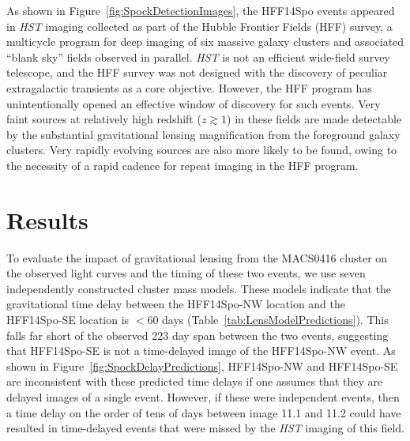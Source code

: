 \documentclass{article}
\def\HST{{\it HST}\xspace}
\def\spock{HFF14Spo\xspace}
\def\spockone{HFF14Spo-NW\xspace}
\def\spocktwo{HFF14Spo-SE\xspace}
\def\MACS0416{MACS0416\xspace}
\begin{document}
As shown in Figure~\ref{fig:SpockDetectionImages}, the \spock events
appeared in \HST imaging collected as part of
the Hubble Frontier Fields (HFF) survey\cite{Lotz:2017}, a multicycle
program for deep imaging of six massive galaxy clusters and associated
``blank sky'' fields observed in parallel.  \HST is not an efficient
wide-field survey telescope, and the HFF survey was not designed with
the discovery of peculiar extragalactic transients as a core
objective.  However, the HFF program has unintentionally opened an
effective window of discovery for such events.  Very faint sources at
relatively high redshift ($z\gtrsim1$) in these fields are made
detectable by the substantial gravitational lensing magnification from
the foreground galaxy clusters.  Very rapidly evolving sources are
also more likely to be found, owing to the necessity of a rapid cadence
for repeat imaging in the HFF program.



\section{Results}\label{sec:Results}

To evaluate the impact of gravitational lensing from the \MACS0416
cluster on the observed light curves and the timing of these two
events, we use seven independently constructed cluster mass models.
These models indicate that the gravitational time delay between the
\spockone location and the \spocktwo location is $<$60 days
(Table~\ref{tab:LensModelPredictions}).  This falls far short of the
observed 223 day span between the two events, suggesting that
\spocktwo is not a time-delayed image of the \spockone event.  As
shown in Figure~\ref{fig:SpockDelayPredictions}, \spockone and
\spocktwo are inconsistent with these predicted time delays if one
assumes that they are delayed images of a single event.  However, if
these were independent events, then a time delay on the order of tens
of days between image 11.1 and 11.2 could have resulted in
time-delayed events that were missed by the \HST imaging of this
field.

\end{document}
